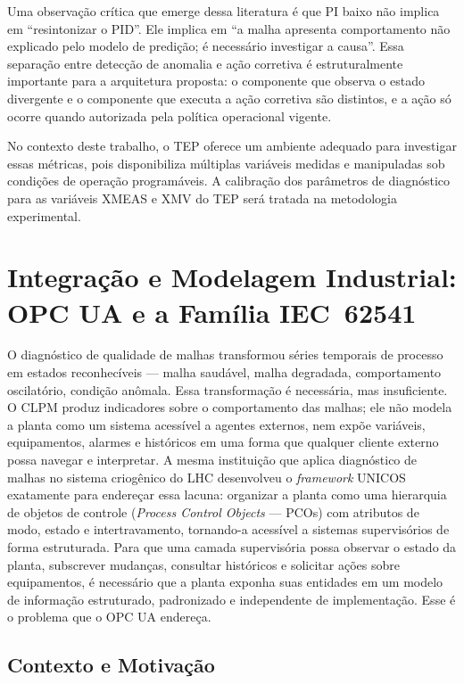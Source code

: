 Uma observação crítica que emerge dessa literatura é que PI baixo não implica em ``resintonizar o PID''. Ele implica em ``a malha apresenta comportamento não explicado pelo modelo de predição; é necessário investigar a causa''. Essa separação entre detecção de anomalia e ação corretiva é estruturalmente importante para a arquitetura proposta: o componente que observa o estado divergente e o componente que executa a ação corretiva são distintos, e a ação só ocorre quando autorizada pela política operacional vigente.

No contexto deste trabalho, o TEP oferece um ambiente adequado para investigar essas métricas, pois disponibiliza múltiplas variáveis medidas e manipuladas sob condições de operação programáveis. A calibração dos parâmetros de diagnóstico para as variáveis XMEAS e XMV do TEP será tratada na metodologia experimental.


\section{Integração e Modelagem Industrial: OPC UA e a Família IEC~62541}
\label{sec:opcua}

O diagnóstico de qualidade de malhas transformou séries temporais de processo em estados reconhecíveis --- malha saudável, malha degradada, comportamento oscilatório, condição anômala. Essa transformação é necessária, mas insuficiente. O CLPM produz indicadores sobre o comportamento das malhas; ele não modela a planta como um sistema acessível a agentes externos, nem expõe variáveis, equipamentos, alarmes e históricos em uma forma que qualquer cliente externo possa navegar e interpretar. A mesma instituição que aplica diagnóstico de malhas no sistema criogênico do LHC desenvolveu o \textit{framework} UNICOS \cite{Gayet2004} exatamente para endereçar essa lacuna: organizar a planta como uma hierarquia de objetos de controle (\textit{Process Control Objects} --- PCOs) com atributos de modo, estado e intertravamento, tornando-a acessível a sistemas supervisórios de forma estruturada. Para que uma camada supervisória possa observar o estado da planta, subscrever mudanças, consultar históricos e solicitar ações sobre equipamentos, é necessário que a planta exponha suas entidades em um modelo de informação estruturado, padronizado e independente de implementação. Esse é o problema que o OPC UA endereça.

\subsection{Contexto e Motivação}

